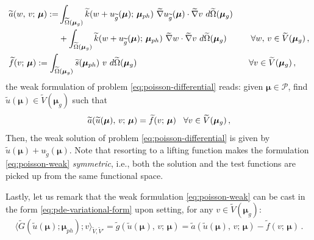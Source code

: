 \documentclass[12pt, a4paper, twoside, openright]{report}
\numberwithin{equation}{chapter}
\theoremstyle{theorem}
\theoremstyle{definition}
\theoremstyle{remark}
\theoremstyle{proposition}
\numberwithin{figure}{chapter}
\newcommand{\wt}[1]{\widetilde{#1}}
\newcommand{\bg}[1]{\boldsymbol{#1}}
\begin{document}
		\begin{subequations}
			\label{eq:poisson-weak-forms}
			\begin{align}
				&
				\begin{aligned}
				\wt{a}(w, \, v; \, \bg{\mu}) := & \int_{\wt{\Omega}(\bg{\mu}_g)} \wt{k}(w + u_{\wt{g}}(\bg{\mu}); \, \bg{\mu}_{ph}) ~ \wt{\nabla} u_{\wt{g}}(\bg{\mu}) \cdot \wt{\nabla} v ~ d\wt{\Omega}(\bg{\mu}_g) \\
				& + \int_{\wt{\Omega}(\bg{\mu}_g)} \wt{k}(w + u_{\wt{g}}(\bg{\mu}); \, \bg{\mu}_{ph}) ~ \wt{\nabla} w \cdot \wt{\nabla} v ~ d\wt{\Omega}(\bg{\mu}_g) \hspace*{1cm} \forall w, \, v \in \wt{V}(\bg{\mu}_g) \, , 
				\end{aligned} \\
				& \wt{f}(v; \, \bg{\mu}) := \int_{\wt{\Omega}(\bg{\mu}_g)} \wt{s}(\bg{\mu}_{ph}) ~ v ~ d\wt{\Omega}(\bg{\mu}_g) \hspace*{0.5cm} \hspace*{4.125cm} \forall v \in \wt{V}(\bg{\mu}_g) \, ,
			\end{align}
		\end{subequations}
		the weak formulation of problem \eqref{eq:poisson-differential} reads: given $\bg{\mu} \in \mathcal{P}$, find $\wt{u}(\bg{\mu}) \in \wt{V}(\bg{\mu}_g)$ such that
		\begin{equation}
			\label{eq:poisson-weak}
			\wt{a}(\wt{u}(\bg{\mu}), \, v; \, \bg{\mu}) = \wt{f}(v; \, \bg{\mu}) \hspace*{0.3cm} \forall v \in \wt{V}(\bg{\mu}_g) \, , 
		\end{equation}
		Then, the weak solution of problem \eqref{eq:poisson-differential} is given by $\wt{u}(\bg{\mu}) + u_{\wt{g}}(\bg{\mu})$. Note that resorting to a lifting function makes the formulation \eqref{eq:poisson-weak} \emph{symmetric}, i.e., both the solution and the test functions are picked up from the same functional space.
		
		Lastly, let us remark that the weak formulation \eqref{eq:poisson-weak} can be cast in the form \eqref{eq:pde-variational-form} upon setting, for any $v \in \wt{V}(\bg{\mu}_g)$:
			\begin{equation*}
				\langle \wt{G}(\wt{u}(\bg{\mu}); \bg{\mu}_{ph}); v \rangle_{\wt{V},\wt{V}'} = \wt{g}(\wt{u}(\bg{\mu}), \, v; \, \bg{\mu}) = \wt{a}(\wt{u}(\bg{\mu}), \, v; \, \bg{\mu}) - \wt{f}(v; \, \bg{\mu}) \, .
			\end{equation*}
			
	\vspace*{0.3cm}
		
\end{document}
